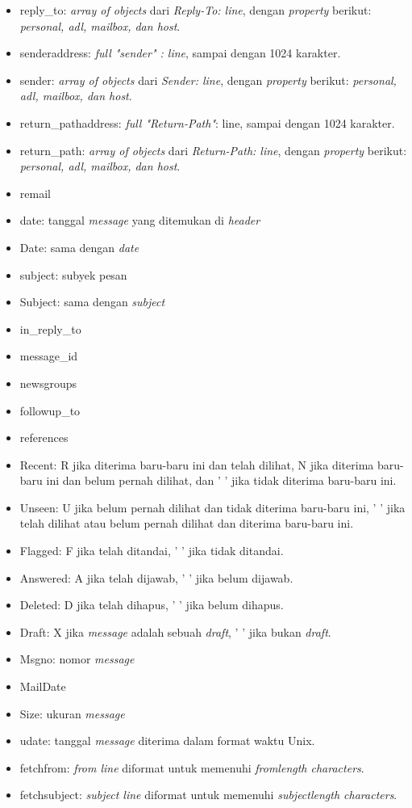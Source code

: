 \begin{itemize}
\begin{itemize}
\begin{itemize}
 \item reply\_to: \textit{array of objects} dari \textit{Reply-To: line}, dengan \textit{property} berikut: \textit{personal, adl, mailbox, dan host}.
 \item senderaddress: \textit{full "sender" : line}, sampai dengan 1024 karakter.
 \item sender: \textit{array of objects} dari \textit{Sender: line}, dengan \textit{property} berikut: \textit{personal, adl, mailbox, dan host}.
 \item return\_pathaddress: \textit{full "Return-Path"}: line, sampai dengan 1024 karakter.
 \item return\_path: \textit{array of objects} dari \textit{Return-Path: line}, dengan \textit{property} berikut: \textit{personal, adl, mailbox, dan host}.
 \item remail
 \item date: tanggal \textit{message} yang ditemukan di \textit{header}
 \item Date: sama dengan \textit{date}
 \item subject: subyek pesan
 \item Subject: sama dengan \textit{subject}
 \item in\_reply\_to
 \item message\_id
 \item newsgroups
 \item followup\_to
 \item references
 \item Recent: R jika diterima baru-baru ini dan telah dilihat, N jika diterima baru-baru ini dan belum pernah dilihat, dan ' ' jika tidak diterima baru-baru ini.
 \item Unseen: U jika belum pernah dilihat dan tidak diterima baru-baru ini, ' ' jika telah dilihat atau belum pernah dilihat dan diterima baru-baru ini.
 \item Flagged: F jika telah ditandai, ' ' jika tidak ditandai.
 \item Answered: A jika telah dijawab, ' ' jika belum dijawab.
 \item Deleted: D jika telah dihapus, ' ' jika belum dihapus.
 \item Draft: X jika \textit{message} adalah sebuah \textit{draft}, ' ' jika bukan \textit{draft}.
 \item Msgno: nomor \textit{message}
 \item MailDate
 \item Size: ukuran \textit{message}
 \item udate: tanggal \textit{message} diterima dalam format waktu Unix.
 \item fetchfrom: \textit{from line} diformat untuk memenuhi \textit{fromlength characters}.
 \item fetchsubject: \textit{subject line} diformat untuk memenuhi \textit{subjectlength characters}.
 \end{itemize}
\end{itemize}
 


\end{itemize}
